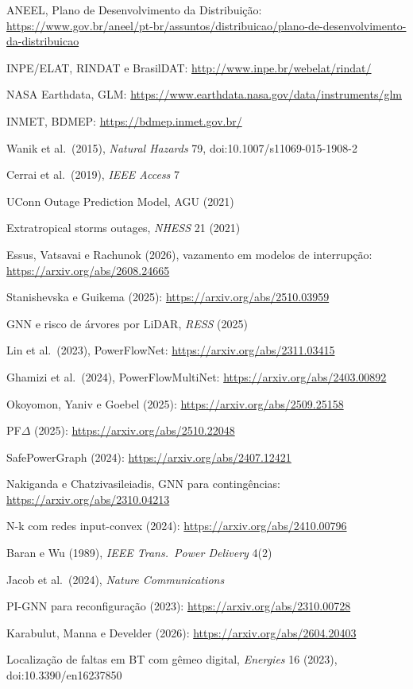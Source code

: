 {\begin{enumerate}[label={[\arabic*]},leftmargin=2.2em,itemsep=1pt]
\item ANEEL, Plano de Desenvolvimento da Distribuição: \url{https://www.gov.br/aneel/pt-br/assuntos/distribuicao/plano-de-desenvolvimento-da-distribuicao}
\item INPE/ELAT, RINDAT e BrasilDAT: \url{http://www.inpe.br/webelat/rindat/}
\item NASA Earthdata, GLM: \url{https://www.earthdata.nasa.gov/data/instruments/glm}
\item INMET, BDMEP: \url{https://bdmep.inmet.gov.br/}
\item Wanik et al.\ (2015), \emph{Natural Hazards} 79, doi:10.1007/s11069-015-1908-2
\item Cerrai et al.\ (2019), \emph{IEEE Access} 7
\item UConn Outage Prediction Model, AGU (2021)
\item Extratropical storms outages, \emph{NHESS} 21 (2021)
\item Essus, Vatsavai e Rachunok (2026), vazamento em modelos de interrupção: \url{https://arxiv.org/abs/2608.24665}
\item Stanishevska e Guikema (2025): \url{https://arxiv.org/abs/2510.03959}
\item GNN e risco de árvores por LiDAR, \emph{RESS} (2025)
\item Lin et al.\ (2023), PowerFlowNet: \url{https://arxiv.org/abs/2311.03415}
\item Ghamizi et al.\ (2024), PowerFlowMultiNet: \url{https://arxiv.org/abs/2403.00892}
\item Okoyomon, Yaniv e Goebel (2025): \url{https://arxiv.org/abs/2509.25158}
\item PF$\Delta$ (2025): \url{https://arxiv.org/abs/2510.22048}
\item SafePowerGraph (2024): \url{https://arxiv.org/abs/2407.12421}
\item Nakiganda e Chatzivasileiadis, GNN para contingências: \url{https://arxiv.org/abs/2310.04213}
\item N-k com redes input-convex (2024): \url{https://arxiv.org/abs/2410.00796}
\item Baran e Wu (1989), \emph{IEEE Trans.\ Power Delivery} 4(2)
\item Jacob et al.\ (2024), \emph{Nature Communications}
\item PI-GNN para reconfiguração (2023): \url{https://arxiv.org/abs/2310.00728}
\item Karabulut, Manna e Develder (2026): \url{https://arxiv.org/abs/2604.20403}
\item Localização de faltas em BT com gêmeo digital, \emph{Energies} 16 (2023), doi:10.3390/en16237850

\end{enumerate}}
